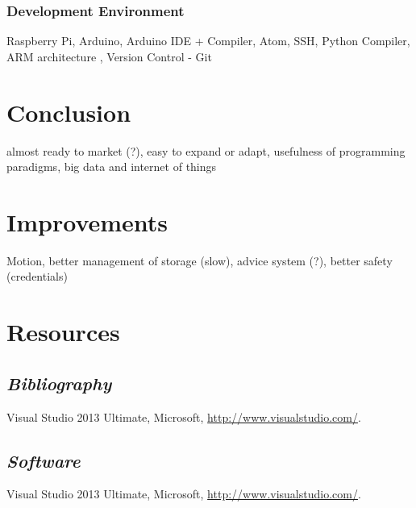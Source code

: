 \documentclass[12pt]{report}
\begin{document}
\subsection{Development Environment}

Raspberry Pi, Arduino, Arduino IDE  + Compiler, Atom, SSH, Python Compiler, ARM architecture , Version Control - Git

\newpage
\chapter{Conclusion}

almost ready to market (?), easy to expand or adapt, usefulness of programming paradigms, big data and internet of things

\newpage
\chapter{Improvements}

Motion, better management of storage (slow), advice system (?), better safety (credentials)
\newpage
\chapter{Resources}
\section{\it{Bibliography}}
\begin{description}
\item Visual Studio 2013 Ultimate, Microsoft, \url{http://www.visualstudio.com/}.
\end{description}
\section{\it{Software}}
\begin{description}
\item Visual Studio 2013 Ultimate, Microsoft, \url{http://www.visualstudio.com/}.
\end{description}

\newpage
\end{document}
